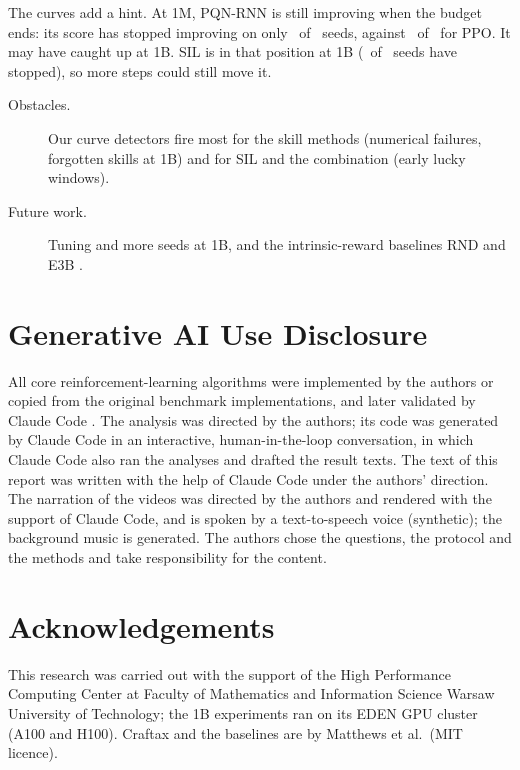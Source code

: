 \documentclass[cameraready]{Interspeech}
\begin{document}
The curves add a hint. At 1M, PQN-RNN is still improving when the budget ends: its score has stopped improving on only \speedPlateauOneMPqnRnn\ of \speedRunsOneMPqnRnn\ seeds, against \speedPlateauOneMPpo\ of \speedRunsOneMPpo\ for PPO. It may have caught up at 1B. SIL is in that position at 1B (\speedPlateauOneBSil\ of \speedRunsOneBSil\ seeds have stopped), so more steps could still move it.
\begin{description}
\item[Obstacles.] Our curve detectors fire most for the skill methods (numerical failures, forgotten skills at 1B) and for SIL and the combination (early lucky windows).
\item[Future work.] Tuning and more seeds at 1B, and the intrinsic-reward baselines RND \cite{burda2019exploration} and E3B \cite{henaff2022exploration}.
\end{description}

\clearpage\raggedbottom
\section{Generative AI Use Disclosure}

All core reinforcement-learning algorithms were implemented by the authors or copied from the original benchmark implementations, and later validated by Claude Code \cite{anthropic2025claudecode}. The analysis was directed by the authors; its code was generated by Claude Code in an interactive, human-in-the-loop conversation, in which Claude Code also ran the analyses and drafted the result texts. The text of this report was written with the help of Claude Code under the authors' direction. The narration of the videos was directed by the authors and rendered with the support of Claude Code, and is spoken by a text-to-speech voice (synthetic); the background music is generated. The authors chose the questions, the protocol and the methods and take responsibility for the content.

\section{Acknowledgements}

This research was carried out with the support of the High Performance Computing Center at Faculty of Mathematics and Information Science Warsaw University of Technology; the 1B experiments ran on its EDEN GPU cluster (A100 and H100). Craftax and the baselines are by Matthews et al.\ (MIT licence).



\end{document}
